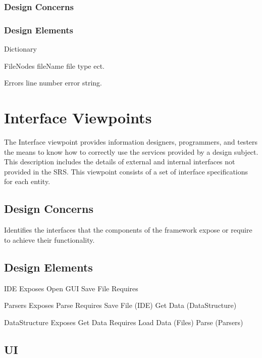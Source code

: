 \documentclass[letterpaper,10pt,titlepage,draftclsnofoot,onecolumn,onesided] {IEEEtran}
\begin{document}
\subsubsection{Design Concerns}
\subsubsection{Design Elements}
	Dictionary
	
	FileNodes
		fileName
		file type ect.
		
	Errors
		line number
		error string.

		
		
		



\section{Interface Viewpoints}
The Interface viewpoint provides information designers, programmers, and testers the means to know how
to correctly use the services provided by a design subject. This description includes the details of external
and internal interfaces not provided in the SRS. This viewpoint consists of a set of interface specifications
for each entity. 
\subsection{Design Concerns}
Identifies the interfaces that the components of the framework expose or require to achieve their
functionality. 
\subsection{Design Elements}


	IDE
		Exposes
			Open GUI
			Save File
		Requires
	
	Parsers
		Exposes
			Parse 
		Requires
			Save File (IDE)
			Get Data (DataStructure)
	
	DataStructure
		Exposes
			Get Data
		Requires
			Load Data (Files)
			Parse (Parsers)
	
\subsection{UI}
\end{document}
